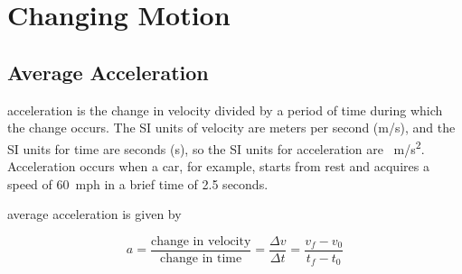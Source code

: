 \documentclass[main.tex]{subfiles}
\begin{document}
\section{Changing Motion}

\subsection{Average Acceleration}


\Gls{acceleration} is the change in velocity divided by a period of time during which the change occurs. The SI units of velocity are meters per second (m/s), and the SI units for time are seconds (s), so the SI units for acceleration are \SI{}{m/s^2}. Acceleration occurs when a car, for example, starts from rest and acquires a speed of \SI{60}{mph} in a brief time of 2.5 seconds. 

\begin{center}
\end{center}

\vspace{1em}

\Gls{average acceleration} is given by

\begin{equation} \label{33EGTg}
    a = \frac{\text{change in velocity}}{\text{change in time}} = \frac{\Delta{v}}{\Delta{t}} = \frac{v_f - v_0}{t_f - t_0}
\end{equation}
\end{document}
